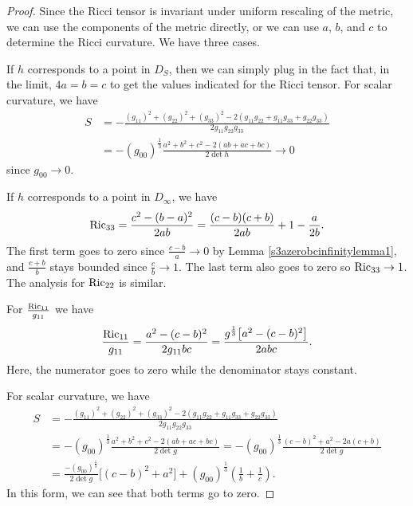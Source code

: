 \documentclass[pdftex]{sigma}
\numberwithin{equation}{section}
\begin{document}
\begin{proof}
Since the Ricci tensor is invariant under uniform rescaling of the metric, we can use the components of the metric directly, or we can use $a$, $b$, and $c$ to determine the Ricci curvature. We have three cases.

If $h$ corresponds to a point in $D_S$, then we can simply plug in the fact that, in the limit, $4a = b = c$ to get the values indicated for the Ricci tensor. For scalar curvature, we have{\samepage
\begin{align*}
S &= - \frac{(g_{11})^2 + (g_{22})^2+(g_{33})^2 - 2(g_{11} g_{22} + g_{11} g_{33} + g_{22} g_{33})}
			{2 g_{11} g_{22} g_{33}} \\
	&= -(g_{00})^{\frac{1}{3}} \frac{a^2 + b^2 + c^2 - 2(ab + ac + bc)}{2 \det h} \rightarrow 0
\end{align*}
since $g_{00} \rightarrow 0$.}

If $h$ corresponds to a point in $D_{\infty}$, we have
\begin{gather*}
{\rm Ric}_{33} = \frac{c^2 - (b-a)^2}{2ab}
		 = \frac{(c-b)(c+b)}{2ab} + 1 - \frac{a}{2b}.
\end{gather*}
The first term goes to zero since $\frac{c - b}{a} \rightarrow 0$ by Lemma \ref{s3azerobcinfinitylemma1}, and $\frac{c+b}{b}$ stays bounded since $\frac{c}{b} \rightarrow 1$. The last term also goes to zero so ${\rm Ric}_{33} \rightarrow 1$. The analysis for ${\rm Ric}_{22}$ is similar.

For $\frac{{\rm Ric}_{11}}{g_{11}}$ we have
\begin{equation*}
\frac{{\rm Ric}_{11}}{g_{11}} = \frac{a^2 - (c - b)^2}{2g_{11}bc}
				= \frac{g^{\frac{1}{3}}\big[a^2 - (c - b)^2\big]}{2abc}.
\end{equation*}
Here, the numerator goes to zero while the denominator stays constant.

For scalar curvature, we have
\begin{align*}
S &= - \frac{(g_{11})^2 + (g_{22})^2+(g_{33})^2 - 2(g_{11} g_{22} + g_{11} g_{33} + g_{22} g_{33})}
			{2 g_{11} g_{22} g_{33}} \\
	&= -(g_{00})^{\frac{1}{3}} \frac{a^2 + b^2 + c^2 - 2(ab + ac + bc)}{2 \det g}
	 = -(g_{00})^{\frac{1}{3}} \frac{(c - b)^2 + a^2 - 2a(c + b)}{2 \det g} \\
	&= \frac{-(g_{00})^{\frac{1}{3}}}{2 \det g}\big[(c-b)^2 + a^2\big]
		+ (g_{00})^{\frac{1}{3}} \left(\frac{1}{b} + \frac{1}{c} \right).
\end{align*}
In this form, we can see that both terms go to zero.


\end{proof}
\end{document}
